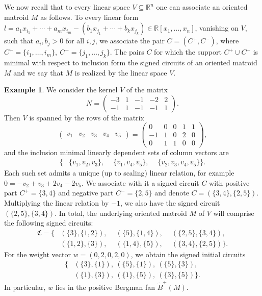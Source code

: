 \documentclass{article}
\theoremstyle{definition}
\newtheorem{example}[theorem]{Example}
\newcommand{\R}{\mathbb{R}}
\begin{document}
We now recall that 
to every linear space $V\subseteq \R^n$
one can associate an oriented matroid $M$ as follows. To every linear form $l = a_1x_{i_1}+\cdots + a_mx_{i_m}-\left( b_1x_{j_1}+\cdots+   b_kx_{j_k}
 \right) \in \mathbb{R}[x_1, \dots, x_n]$, vanishing on $V$, such that $a_i, b_j>0$ for all $i, j$, we associate the 
 pair $C = (C^+, C^-)$, where
 $C^+ = \{i_1, \dots, i_m\}, \ C^- = \{ j_1, \dots, j_k\}$.
The pairs $C$ for which the support $C^+ \cup C^-$ is minimal with respect to inclusion form the signed circuits of an oriented matroid $M$ and we say that $M$ is realized by the linear space $V$.
 \begin{example}
\label{Ex::BergmanFanofN} 
We consider the kernel $V$ of the matrix
  \[  N = \begin{pmatrix}
    -3 & 1 & -1 & -2 & 2 \\
    -1 & 1 & -1 & -1 & 1
\end{pmatrix}.\]
Then $V$ is spanned by the rows of the matrix
  \[
    \begin{pmatrix}
    v_1 & v_2 & v_3 & v_4 & v_5
    \end{pmatrix} =
  \begin{pmatrix}
    0 & 0 & 0 & 1 & 1 \\
    -1 & 1 & 0 & 2 & 0 \\
    0 & 1 & 1 & 0 & 0
\end{pmatrix},\]
and the inclusion minimal linearly dependent sets of column vectors are
\begin{align*}
    \big\{ &\{v_1,v_2,v_3\}, \phantom{-} \{v_1,v_4,v_5\}, \phantom{-} \{v_2,v_3,v_4,v_5\} \big\}.
\end{align*}
Each such set admits a unique (up to scaling) linear relation, for example
$0 = -v_2 +v_3 +2v_4 -2v_5$.
We associate with it a signed circuit $C$
with positive part $C^+ = \{3,4\}$ and negative part
$C^- = \{2,5\}$ and denote
$C = (\{3,4\}, \{2,5\})$.
Multiplying the linear relation by $-1$, we also have the signed circuit $(\{2,5\}, \{3,4\})$.
In total, the underlying oriented matroid $M$ of $V$ will comprise the following signed circuits:
  \begin{align*}
 \mathfrak{C} = \big\{ & (\{3\}, \{1,2\}),  \phantom{-}
 (\{5\}, \{1,4\}), \phantom{-}(\{2,5\}, \{3,4\}),
 \\ &(\{1,2\}, \{3\}),  \phantom{-}
 (\{1,4\}, \{5\}), \phantom{-}(\{3,4\}, \{2,5\}) \big\}.
 \end{align*}
For the weight vector $w = (0,2,0,2,0)$, we obtain the signed initial circuits
\begin{align*}
     \big\{ &(\{3\},\{1\}), \   (\{5\}, \{1\}), \ (\{5\}, \{3\}),   \\         
            &(\{1\}, \{3\}), \  (\{1\}, \{5\}), \ (\{3\}, \{5\}) \big\}.
\end{align*}
 In particular, $w$ lies in the positive Bergman fan $\widetilde{B}^+(M)$. 
\end{example}
 
\end{document}
